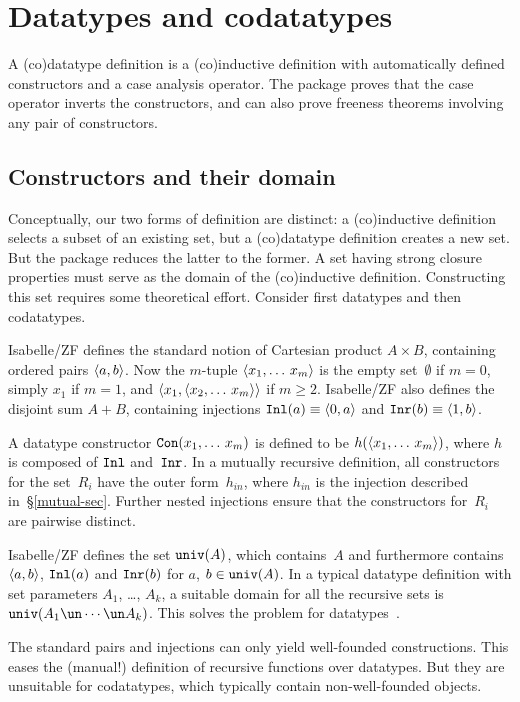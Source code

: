 \section{Datatypes and codatatypes}\label{data-sec}
A (co)datatype definition is a (co)inductive definition with automatically
defined constructors and a case analysis operator.  The package proves that the
case operator inverts the constructors, and can also prove freeness theorems
involving any pair of constructors.


\subsection{Constructors and their domain}\label{univ-sec}
Conceptually, our two forms of definition are distinct: a (co)inductive
definition selects a subset of an existing set, but a (co)datatype
definition creates a new set.  But the package reduces the latter to the
former.  A set having strong closure properties must serve as the domain
of the (co)inductive definition.  Constructing this set requires some
theoretical effort.  Consider first datatypes and then codatatypes.

Isabelle/ZF defines the standard notion of Cartesian product $A\times B$,
containing ordered pairs $\langle a,b\rangle$.  Now the $m$-tuple
$\langle x_1,\ldots\,x_m\rangle$ is the empty set~$\emptyset$ if $m=0$, simply
$x_1$ if $m=1$, and $\langle x_1,\langle x_2,\ldots\,x_m\rangle\rangle$ if $m\geq2$.
Isabelle/ZF also defines the disjoint sum $A+B$, containing injections
${\tt Inl}(a)\equiv\langle0,a\rangle$ and ${\tt Inr}(b)\equiv\langle1,b\rangle$.

A datatype constructor ${\tt Con}(x_1,\ldots\,x_m)$ is defined to be
$h(\langle x_1,\ldots\,x_m\rangle)$, where $h$ is composed of ${\tt Inl}$ and~${\tt Inr}$.
In a mutually recursive definition, all constructors for the set~$R_i$ have
the outer form~$h_{in}$, where $h_{in}$ is the injection described
in~\S\ref{mutual-sec}.  Further nested injections ensure that the
constructors for~$R_i$ are pairwise distinct.  

Isabelle/ZF defines the set ${\tt univ}(A)$, which contains~$A$ and
furthermore contains $\langle a,b\rangle$, ${\tt Inl}(a)$ and ${\tt Inr}(b)$ for $a$,
$b\in{\tt univ}(A)$.  In a typical datatype definition with set parameters
$A_1$, \ldots, $A_k$, a suitable domain for all the recursive sets is
$\univ(A_1\un\cdots\un A_k)$.  This solves the problem for
datatypes~\cite[\S4.2]{paulson-set-II}.

The standard pairs and injections can only yield well-founded
constructions.  This eases the (manual!) definition of recursive functions
over datatypes.  But they are unsuitable for codatatypes, which typically
contain non-well-founded objects.

